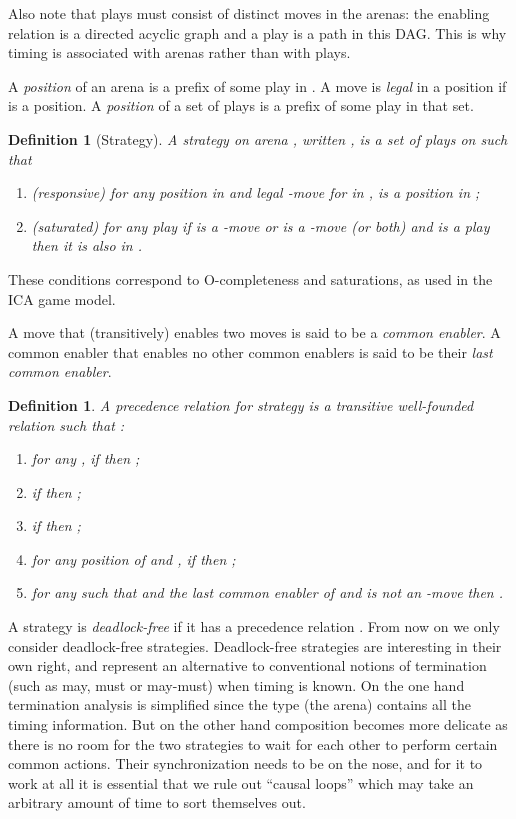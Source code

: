 \documentclass{article}
\newtheorem{definition}[theorem]{Definition}
\begin{document}
Also note that plays must consist of distinct moves in the arenas: the enabling relation is a directed acyclic graph and a play is a path in this DAG. This is why timing is associated with arenas rather than with plays.  

A \emph{position} of an arena  is a prefix of some play  in . A move  is \emph{legal} in a position  if  is a position. A \emph{position} of a set of plays  is a prefix of some play  in that set. 
\begin{definition}[Strategy]\label{def:strat}
A \emph{strategy}  on arena , written , is a set of plays on  such that 
\begin{enumerate}
\item (responsive) for any position  in  and legal -move  for  in ,  is a position in ;
\item (saturated) for any play  if  is a -move or  is a -move (or both) and  is a play then it is also in .
\end{enumerate}
\end{definition}
These conditions correspond to O-completeness and saturations, as used in the ICA game model. 

A move that (transitively) enables two moves is said to be a \emph{common enabler}. A common enabler that enables no other common enablers is said to be their \emph{last common enabler}. 
\begin{definition}\label{def:precs}
A \emph{precedence relation for strategy}  is a transitive well-founded relation  such that :
\begin{enumerate}
\item for any , if  then ;
\item if  then ;
\item if  then ;
\item for any position  of  and , if  then ;
\item for any  such that  and the last common enabler of  and  is not an -move then .
\end{enumerate}
\end{definition}
A strategy  is \emph{deadlock-free} if it has a precedence relation . From now on we only consider deadlock-free strategies. Deadlock-free strategies are interesting in their own right, and represent an alternative to conventional notions of termination (such as may, must or may-must) when timing is known. On the one hand termination analysis is simplified since the type (the arena) contains all the timing information. But on the other hand composition becomes more delicate as there is no room for the two strategies to wait for each other to perform certain common actions. Their synchronization needs to be on the nose, and for it to work at all it is essential that we rule out ``causal loops'' which may take an arbitrary amount of time to sort themselves out.  
\end{document}
